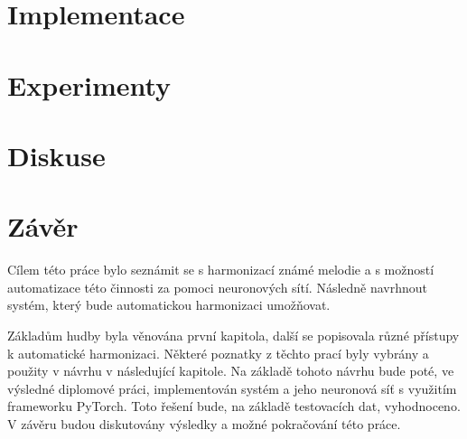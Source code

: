 

\chapter{Implementace}

\chapter{Experimenty}

\chapter{Diskuse}

\chapter{Závěr}
\label{zaver}
Cílem této práce bylo seznámit se s harmonizací známé melodie a s možností automatizace této činnosti za pomoci neuronových sítí.
Následně navrhnout systém, který bude automatickou harmonizaci umožňovat.
\par
Základům hudby byla věnována první kapitola, 
další se popisovala různé přístupy k automatické harmonizaci. Některé poznatky z těchto prací byly vybrány a použity v návrhu v následující kapitole.
Na základě tohoto návrhu bude poté, ve výsledné diplomové práci, implementován systém a jeho neuronová síť s využitím frameworku PyTorch.
Toto řešení bude, na základě testovacích dat, vyhodnoceno.
V závěru budou diskutovány výsledky a možné pokračování této práce.

